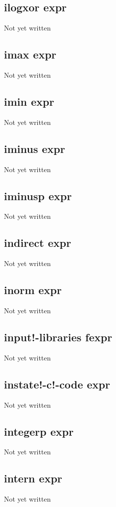 \documentclass[a4paper,11pt]{article}
\begin{document}
\subsection{\ttfamily ilogxor expr}
Not yet written

\subsection{\ttfamily imax expr}
Not yet written

\subsection{\ttfamily imin expr}
Not yet written

\subsection{\ttfamily iminus expr}
Not yet written

\subsection{\ttfamily iminusp expr}
Not yet written

\subsection{\ttfamily indirect expr}
Not yet written

\subsection{\ttfamily inorm expr}
Not yet written

\subsection{\ttfamily input!-libraries fexpr}
Not yet written

\subsection{\ttfamily instate!-c!-code expr}
Not yet written

\subsection{\ttfamily integerp expr}
Not yet written

\subsection{\ttfamily intern expr}
Not yet written
\end{document}
